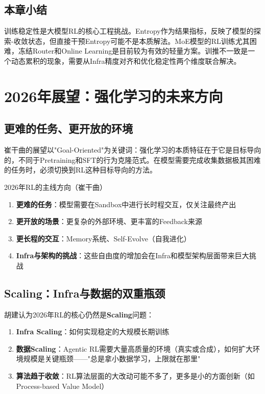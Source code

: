 \documentclass[a4paper]{article}
\begin{document}
\subsection{本章小结}

训练稳定性是大模型RL的核心工程挑战。Entropy作为结果指标，反映了模型的探索-收敛状态，但直接干预Entropy可能不是本质解法。MoE模型的RL训练尤其困难，冻结Router和Online Learning是目前较为有效的轻量方案。训推不一致是一个动态累积的现象，需要从Infra精度对齐和优化稳定性两个维度联合解决。


\section{2026年展望：强化学习的未来方向}

\subsection{更难的任务、更开放的环境}

崔干曲的展望以"Goal-Oriented"为关键词：强化学习的本质特征在于它是目标导向的，不同于Pretraining和SFT的行为克隆范式。在模型需要完成收集数据极其困难的任务时，必须切换到RL这种目标导向的方法。

\begin{importantbox}{2026年RL的主线方向（崔干曲）}
\begin{enumerate}
    \item \textbf{更难的任务}：模型需要在Sandbox中进行长时程交互，仅关注最终产出
    \item \textbf{更开放的场景}：更复杂的外部环境、更丰富的Feedback来源
    \item \textbf{更长程的交互}：Memory系统、Self-Evolve（自我进化）
    \item \textbf{Infra与架构的挑战}：这些自由度的增加会在Infra和模型架构层面带来巨大挑战
\end{enumerate}
\end{importantbox}

\subsection{Scaling：Infra与数据的双重瓶颈}

胡建认为2026年RL的核心仍然是\textbf{Scaling}问题：

\begin{enumerate}
    \item \textbf{Infra Scaling}：如何实现稳定的大规模长期训练
    \item \textbf{数据Scaling}：Agentic RL需要大量高质量的环境（真实或合成），如何扩大环境规模是关键瓶颈——"总是拿小数据学习，上限就在那里"
    \item \textbf{算法趋于收敛}：RL算法层面的大改动可能不多了，更多是小的方面创新（如Process-based Value Model）
\end{enumerate}
\end{document}
